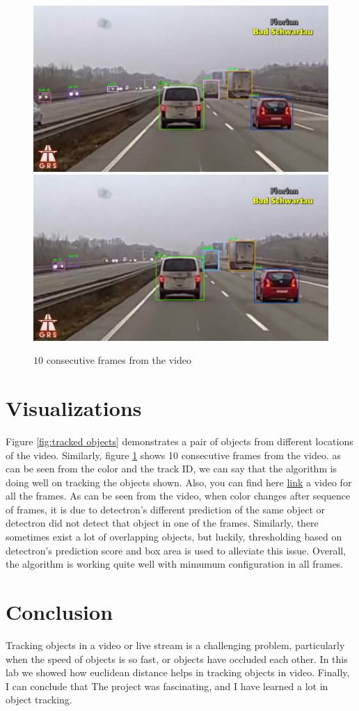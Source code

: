 \documentclass[11pt,a4paper]{article}
\begin{document}
\begin{figure}[ht!]
	\includegraphics[width=.3\textwidth]{f9}\hfill
	\includegraphics[width=.3\textwidth]{f10}\hfill
	\caption{$10$ consecutive frames from the video}
	\label{fig:vid10}
\end{figure}


\section{Visualizations}
Figure \ref{fig:tracked objects} demonstrates a pair of objects from different locations of the video. Similarly, figure \ref{fig:vid10} shows 10 consecutive frames from the video. as can be seen from the color and the track ID, we can say that the algorithm is doing well on tracking the objects shown. Also, you can find here \href{https://drive.google.com/file/d/1SU9l7xqWIhSBf2u6otgfuCLeYygQN1v6/view?usp=sharing}{link} a video for all the frames. As can be seen from the video, when color changes after sequence of frames, it is due to detectron's different prediction of the same object or detectron did not detect that object in one of the frames.  Similarly, there sometimes exist a lot of overlapping objects, but luckily, thresholding based on detectron's prediction score and box area is used to alleviate  this issue. Overall, the algorithm is working quite well with mimumum configuration in all frames. 

\section{Conclusion}
Tracking objects in a video or live stream is a challenging problem, particularly when the speed of objects is so fast, or objects have occluded each other. In this lab we showed how euclidean distance helps in tracking objects in video. Finally, I can conclude that The project was fascinating, and I have learned a lot in object tracking. 
\end{document}
